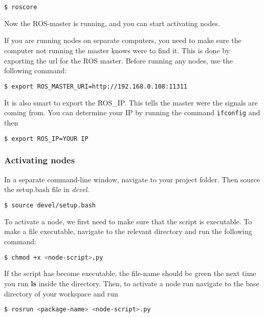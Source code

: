 \begin{lstlisting}[language=bash]
$ roscore
\end{lstlisting}

Now the ROS-master is running, and you can start activating nodes.

If you are running nodes on separate computers, you need to make sure the computer not running the master knows were to find it. This is done by exporting the url for the ROS master. Before running any nodes, use the following command: 

\begin{lstlisting}[language=bash]
 $ export ROS_MASTER_URI=http://192.168.0.108:11311
\end{lstlisting}

 It is also smart to export the ROS\_IP. This tells the master were the signals are coming from. You can determine your IP by running the command \texttt{ifconfig} and then 
 
 \begin{lstlisting}[language=bash]
 $ export ROS_IP=YOUR IP
\end{lstlisting}



\subsubsection{Activating nodes}
In a separate command-line window, navigate to your project folder. Then source the setup.bash file in \textit{devel}. 

\begin{lstlisting}[language=bash]
$ source devel/setup.bash
\end{lstlisting}

To activate a node, we first need to make sure that the script is executable. To make a file executable, navigate to the relevant directory and run the following command: 

\begin{lstlisting}[language=bash]
  $ chmod +x <node-script>.py
\end{lstlisting}

If the script has become executable, the file-name should be green the next time you run \textbf{ls} inside the directory. Then, to activate a node run navigate to the base directory of your workspace and run 

\begin{lstlisting}[language=bash]
$ rosrun <package-name> <node-script>.py
\end{lstlisting}

